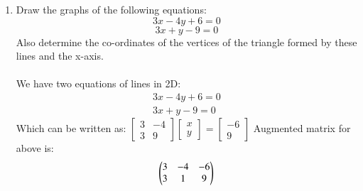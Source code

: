 \documentclass[journal,12pt,twocolumn]{IEEEtran}
\renewcommand\thesection{\arabic{section}}
\begin{document}
\begin{enumerate}[label=\thesection.\arabic*.,ref=\thesection.\theenumi]
\item Draw the graphs of the following equations: 
$$ 3x-4y+6=0 $$
$$ 3x+y-9=0 $$
Also determine the co-ordinates of the vertices of the triangle formed by these lines and the x-axis.
\\
\solution\\
We have two equations of lines in 2D:
\begin{align}
    3x-4y+6=0\\
    3x+y-9=0 
\end{align}
Which can be written as:
$
\begin{bmatrix}
  3 & -4 \\ 3 & 9
\end{bmatrix}
\begin{bmatrix}
  x \\ y
\end{bmatrix}
=
\begin{bmatrix}
  -6 \\ 9
\end{bmatrix}
$
Augmented matrix for above is:
\begin{align}
    \begin{pmatrix}3 & -4 & -6\\
           3 & 1 & 9\end{pmatrix}
\end{align}


\end{enumerate}
\end{document}
